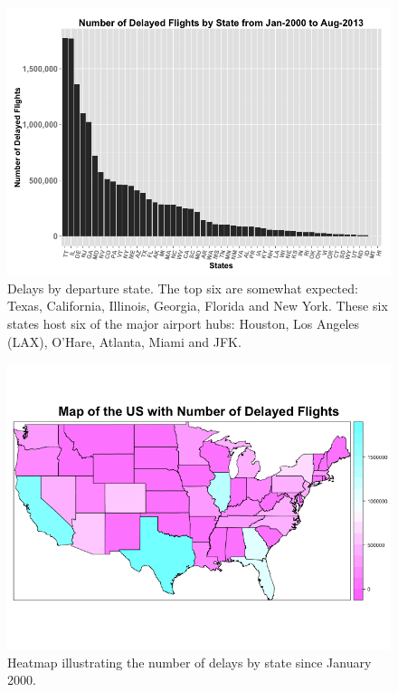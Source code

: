 \documentclass[11pt,twoside,titlepage]{article}
\begin{document}
\begin{figure}[h!]
        \centering
                \includegraphics[width=16cm]{Delays_by_State1.png}
        \caption{Delays by departure state. The top six are somewhat expected: Texas, California, Illinois, Georgia, Florida and New York. These six states host six of the major airport hubs: Houston, Los Angeles (LAX), O'Hare, Atlanta, Miami and JFK.}\label{fig:Delays by State}
\end{figure}

\begin{figure}[h!]
        \centering
                \includegraphics[width=16cm]{USMap1.png}
        \caption{Heatmap illustrating the number of delays by state since January 2000.}\label{fig:}
\end{figure}
\end{document}
